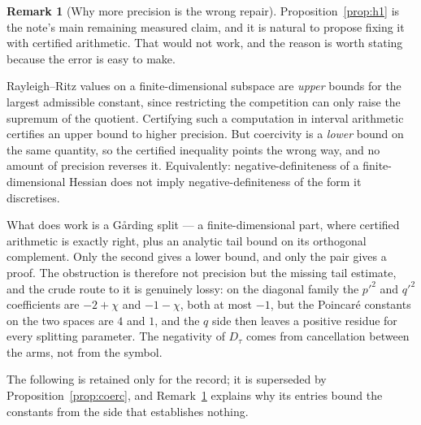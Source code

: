 \documentclass[11pt]{article}
\theoremstyle{definition}
\newtheorem{remark}[theorem]{Remark}
\begin{document}
\begin{remark}[Why more precision is the wrong repair]\label{rem:direction}
Proposition~\ref{prop:h1} is the note's main remaining measured claim, and it is natural to
propose fixing it with certified arithmetic. That would not work, and the reason is worth
stating because the error is easy to make.

Rayleigh--Ritz values on a finite-dimensional subspace are \emph{upper} bounds for the
largest admissible constant, since restricting the competition can only raise the supremum
of the quotient. Certifying such a computation in interval arithmetic certifies an upper
bound to higher precision. But coercivity is a \emph{lower} bound on the same quantity, so
the certified inequality points the wrong way, and no amount of precision reverses it.
Equivalently: negative-definiteness of a finite-dimensional Hessian does not imply
negative-definiteness of the form it discretises.

What does work is a G\aa rding split --- a finite-dimensional part, where certified
arithmetic is exactly right, plus an analytic tail bound on its orthogonal complement.
Only the second gives a lower bound, and only the pair gives a proof. The obstruction is
therefore not precision but the missing tail estimate, and the crude route to it is
genuinely lossy: on the diagonal family the $p'^2$ and $q'^2$ coefficients are $-2+\chi$
and $-1-\chi$, both at most $-1$, but the Poincar\'e constants on the two spaces are $4$
and $1$, and the $q$ side then leaves a positive residue for every splitting parameter. The
negativity of $D_\tau$ comes from cancellation between the arms, not from the symbol.
\end{remark}

The following is retained only for the record; it is superseded by
Proposition~\ref{prop:coerc}, and Remark~\ref{rem:direction} explains why its entries
bound the constants from the side that establishes nothing.
\end{document}

